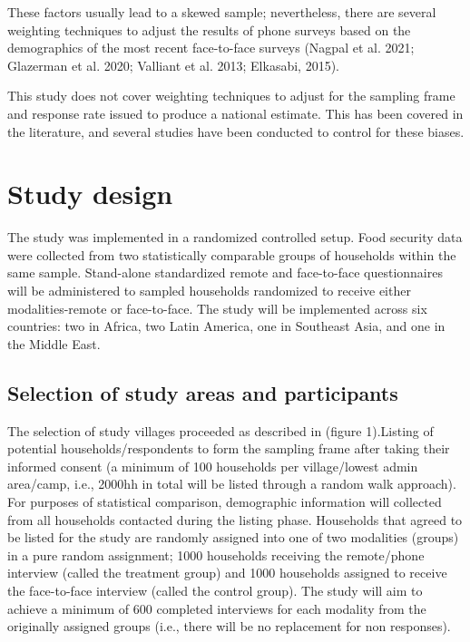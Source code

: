 \documentclass[11pt,harvard]{article}
\begin{document}
	These factors usually lead to a skewed sample; nevertheless, there are several weighting techniques to adjust the results of phone surveys based on the demographics of the most recent face-to-face surveys (Nagpal et al. 2021; Glazerman et al. 2020; Valliant et al. 2013; Elkasabi, 2015).
	
	This study does not cover weighting techniques to adjust for the sampling frame and response rate issued to produce a national estimate. This has been covered in the literature, and several studies have been conducted to control for these biases.
	
	\pagebreak
	
	\section{Study design}
	
	The study was implemented in a randomized controlled setup. 
	Food security data were collected from two statistically comparable groups of households within the same sample. Stand-alone standardized remote and face-to-face questionnaires will be administered to sampled households randomized to receive either modalities-remote or face-to-face. The study will be implemented across six countries: two in Africa, two Latin America, one in Southeast Asia, and one in the Middle East. 
	
	\subsection{Selection of study areas and participants}
	
	The selection of study villages proceeded as described in (figure 1).Listing of potential households/respondents to form the sampling frame after taking their informed consent (a minimum of 100 households per village/lowest admin area/camp, i.e., 2000hh in total will be listed through a random walk approach). For purposes of statistical comparison, demographic information will collected from all households contacted during the listing phase. Households that agreed to be listed for the study are randomly assigned into one of two modalities (groups) in a pure random assignment; 1000 households receiving the remote/phone interview (called the treatment group) and 1000 households assigned to receive the face-to-face interview (called the control group). 
	The study will aim to achieve a minimum of 600 completed interviews for each modality from the originally assigned groups (i.e., there will be no replacement for non responses).  
	
\end{document}
